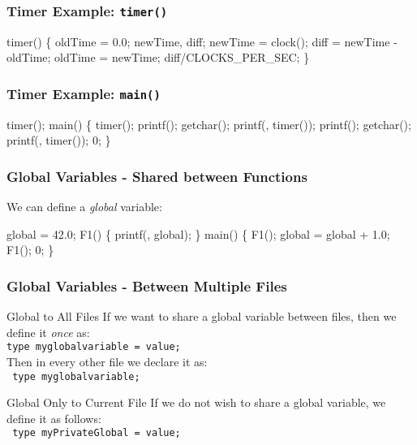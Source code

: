 \documentclass[smaller,table]{beamer} %
\begin{document}
\begin{frame}[fragile]
\frametitle{Timer Example: {\tt timer()}}
\begin{semiverbatim}
\kr\kl{}  
\kl
\kl{} timer()
\kl\{
\kl   {} oldTime = 0.0;
\kl   {} newTime, diff;
\kl
\kl   newTime = clock();
\kl   diff = newTime - oldTime;
\kl   oldTime = newTime;
\kl   {} diff/CLOCKS_PER_SEC;
\kl\}
\end{semiverbatim}
\end{frame}

\begin{frame}[fragile]
\frametitle{Timer Example: {\tt main()}}
\begin{semiverbatim}
\small
\kr\kl{} 
\kl
\kl{} timer(); 
\kl
\kl{} main()
\kl\{
\kl   timer(); 
\kl   printf();
\kl   getchar(); 
\kl   printf(, timer());
\kl   printf();
\kl   getchar();
\kl   printf(, timer());
\kl   {} 0;
\kl\}
\end{semiverbatim}
\end{frame}

\begin{frame}[fragile]
\frametitle{Global Variables - Shared between Functions}
We can define a \emph{global} variable:
\begin{semiverbatim}
\small
\kr\kl{} 
\kl
\kl{} global = 42.0;
\kl
\kl{} F1()
\kl\{
\kl   printf(, global);
\kl\}
\kl
\kl{} main()
\kl\{
\kl   F1();
\kl   global = global + 1.0;
\kl   F1();
\kl   {} 0;
\kl\}
\end{semiverbatim}
\end{frame}

\begin{frame}
\frametitle{Global Variables - Between Multiple Files}
\begin{exampleblock}{Global to All Files}
If we want to share a global variable between files,
then we define it \emph{once} as:\\
{\tt type myglobalvariable = value;}\\
Then in every other file we declare it as:\\
{\tt {} type myglobalvariable;}
\end{exampleblock}

\begin{alertblock}{Global Only to Current File}
If we do not wish to share a global variable, we
define it as follows:\\
{\tt {} type myPrivateGlobal = value;}
\end{alertblock}
\end{frame}
\end{document}
